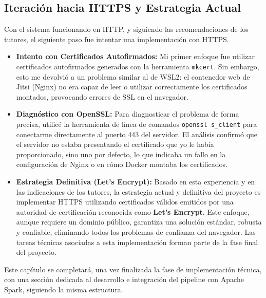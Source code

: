 \subsection{Iteración hacia HTTPS y Estrategia Actual}
Con el sistema funcionando en HTTP, y siguiendo las recomendaciones de los tutores, el siguiente paso fue intentar una implementación con HTTPS.
\begin{itemize}
    \item \textbf{Intento con Certificados Autofirmados:} Mi primer enfoque fue utilizar certificados autofirmados generados con la herramienta \texttt{mkcert}. Sin embargo, esto me devolvió a un problema similar al de WSL2: el contenedor web de Jitsi (Nginx) no era capaz de leer o utilizar correctamente los certificados montados, provocando errores de SSL en el navegador.
    
    \item \textbf{Diagnóstico con OpenSSL:} Para diagnosticar el problema de forma precisa, utilicé la herramienta de línea de comandos \texttt{openssl s\_client} para conectarme directamente al puerto 443 del servidor. El análisis confirmó que el servidor no estaba presentando el certificado que yo le había proporcionado, sino uno por defecto, lo que indicaba un fallo en la configuración de Nginx o en cómo Docker montaba los certificados.
    
    \item \textbf{Estrategia Definitiva (Let's Encrypt):} Basado en esta experiencia y en las indicaciones de los tutores, la estrategia actual y definitiva del proyecto es implementar HTTPS utilizando certificados válidos emitidos por una autoridad de certificación reconocida como \textbf{Let's Encrypt}. Este enfoque, aunque requiere un dominio público, garantiza una solución estándar, robusta y confiable, eliminando todos los problemas de confianza del navegador. Las tareas técnicas asociadas a esta implementación forman parte de la fase final del proyecto.
\end{itemize}

Este capítulo se completará, una vez finalizada la fase de implementación técnica, con una sección dedicada al desarrollo e integración del pipeline con Apache Spark, siguiendo la misma estructura.

